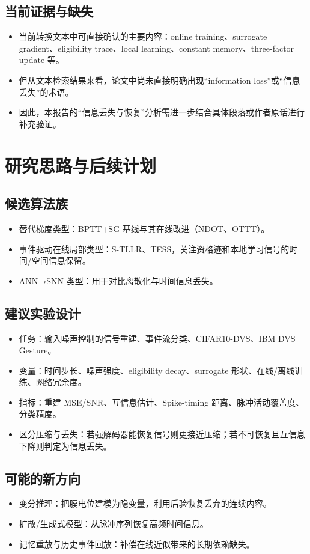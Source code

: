 \documentclass[journal,12pt,onecolumn]{IEEEtran}
\begin{document}
\subsection{当前证据与缺失}
\begin{itemize}
  \item 当前转换文本中可直接确认的主要内容：online training、surrogate gradient、eligibility trace、local learning、constant memory、three-factor update 等。\
  \item 但从文本检索结果来看，论文中尚未直接明确出现“information loss”或“信息丢失”的术语。\
  \item 因此，本报告的“信息丢失与恢复”分析需进一步结合具体段落或作者原话进行补充验证。\
\end{itemize}

\section{研究思路与后续计划}
\subsection{候选算法族}
\begin{itemize}
  \item 替代梯度类型：BPTT+SG 基线与其在线改进（NDOT、OTTT）。\
  \item 事件驱动在线局部类型：S-TLLR、TESS，关注资格迹和本地学习信号的时间/空间信息保留。\
  \item ANN→SNN 类型：用于对比离散化与时间信息丢失。\
\end{itemize}

\subsection{建议实验设计}
\begin{itemize}
  \item 任务：输入噪声控制的信号重建、事件流分类、CIFAR10-DVS、IBM DVS Gesture。\
  \item 变量：时间步长、噪声强度、eligibility decay、surrogate 形状、在线/离线训练、网络冗余度。\
  \item 指标：重建 MSE/SNR、互信息估计、Spike-timing 距离、脉冲活动覆盖度、分类精度。\
  \item 区分压缩与丢失：若强解码器能恢复信号则更接近压缩；若不可恢复且互信息下降则判定为信息丢失。\
\end{itemize}

\subsection{可能的新方向}
\begin{itemize}
  \item 变分推理：把膜电位建模为隐变量，利用后验恢复丢弃的连续内容。\
  \item 扩散/生成式模型：从脉冲序列恢复高频时间信息。\
  \item 记忆重放与历史事件回放：补偿在线近似带来的长期依赖缺失。\
\end{itemize}
\end{document}

